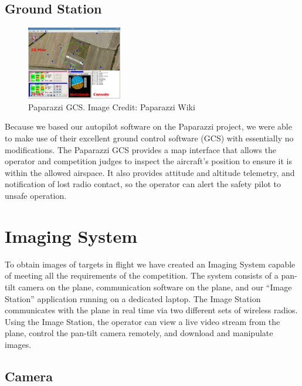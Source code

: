 \documentclass[pdftex,10pt,letter]{article}
\begin{document}
\subsection{Ground Station}

\begin{figure}
	\includegraphics[width=0.37\textwidth]{../images/paparazzi_gcs.jpg}
	\caption{Paparazzi GCS. Image Credit: Paparazzi Wiki\cite{}}
	\label{fig:paparazzi_gcs}
\end{figure}
Because we based our autopilot software on the Paparazzi project, we were able to make use of their excellent ground control software (GCS) with essentially no modifications. The Paparazzi GCS provides a map interface that allows the operator and competition judges to inspect the aircraft's position to ensure it is within the allowed airspace. It also provides attitude and altitude telemetry, and notification of lost radio contact, so the operator can alert the safety pilot to unsafe operation.



\section{Imaging System}

To obtain images of targets in flight we have created an Imaging System capable of meeting all the requirements of the competition.  The system consists of a pan-tilt camera on the plane, communication software on the plane, and our ``Image Station'' application running on a dedicated laptop.  The Image Station communicates with the plane in real time via two different sets of wireless radios.  Using the Image Station, the operator can view a live video stream from the plane, control the pan-tilt camera remotely, and download and manipulate images.

\subsection{Camera}
\end{document}
